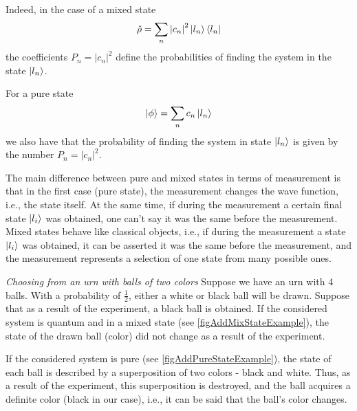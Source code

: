 Indeed, in the case of a mixed state
\begin{equation}
\hat{\rho} = 
\sum_n \left|c_n\right|^2 \ket{l_n}\bra{l_n}
\nonumber
\end{equation}
the coefficients $P_n = \left|c_n\right|^2$ define the probabilities of finding the system in the state $\ket{l_n}$.

For a pure state
\begin{equation}
\left| \phi \right> = 
\sum_n c_n \ket{l_n}
\nonumber
\end{equation}
we also have that the probability of finding the system in state $\ket{l_n}$ is given by the number $P_n = \left|c_n\right|^2$.

The main difference between pure and mixed states in terms of measurement is that in the first case (pure state), the measurement changes the wave function, i.e., the state itself. At the same time, if during the measurement a certain final state $\ket{l_i}$ was obtained, one can't say it was the same before the measurement. Mixed states  behave like classical objects, i.e., if during the measurement a state $\ket{l_i}$ was obtained, it can be asserted it was the same before the measurement, and the measurement represents a selection of one state from many possible ones.

\begin{example}
\emph{Choosing from an urn with balls of two colors}
Suppose we have an urn with 4 balls. With a probability of $\frac{1}{2}$, either a white or black ball will be drawn. Suppose that as a result of the experiment, a black ball is obtained. If the considered system is quantum and in a mixed state (see \autoref{figAddMixStateExample}), the state of the drawn ball (color) did not change as a result of the experiment.




If the considered system is pure (see \autoref{figAddPureStateExample}), the state of each ball is described by a superposition of two colors - black and white. Thus, as a result of the experiment, this superposition is destroyed, and the ball acquires a definite color (black in our case), i.e., it can be said that the ball's color changes.
\end{example}
